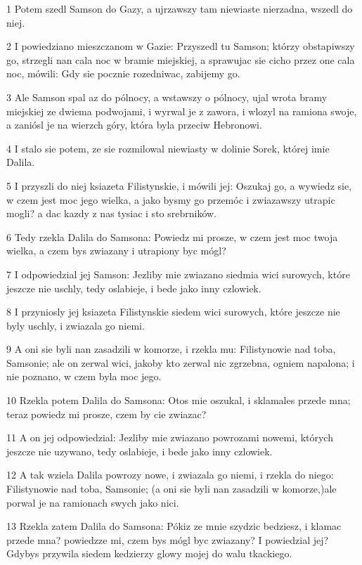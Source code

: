 \par 1 Potem szedl Samson do Gazy, a ujrzawszy tam niewiaste nierzadna, wszedl do niej.
\par 2 I powiedziano mieszczanom w Gazie: Przyszedl tu Samson; którzy obstapiwszy go, strzegli nan cala noc w bramie miejskiej, a sprawujac sie cicho przez one cala noc, mówili: Gdy sie pocznie rozedniwac, zabijemy go.
\par 3 Ale Samson spal az do pólnocy, a wstawszy o pólnocy, ujal wrota bramy miejskiej ze dwiema podwojami, i wyrwal je z zawora, i wlozyl na ramiona swoje, a zaniósl je na wierzch góry, która byla przeciw Hebronowi.
\par 4 I stalo sie potem, ze sie rozmilowal niewiasty w dolinie Sorek, której imie Dalila.
\par 5 I przyszli do niej ksiazeta Filistynskie, i mówili jej: Oszukaj go, a wywiedz sie, w czem jest moc jego wielka, a jako bysmy go przemóc i zwiazawszy utrapic mogli? a dac kazdy z nas tysiac i sto srebrników.
\par 6 Tedy rzekla Dalila do Samsona: Powiedz mi prosze, w czem jest moc twoja wielka, a czem bys zwiazany i utrapiony byc mógl?
\par 7 I odpowiedzial jej Samson: Jezliby mie zwiazano siedmia wici surowych, które jeszcze nie uschly, tedy oslabieje, i bede jako inny czlowiek.
\par 8 I przyniosly jej ksiazeta Filistynskie siedem wici surowych, które jeszcze nie byly uschly, i zwiazala go niemi.
\par 9 A oni sie byli nan zasadzili w komorze, i rzekla mu: Filistynowie nad toba, Samsonie; ale on zerwal wici, jakoby kto zerwal nic zgrzebna, ogniem napalona; i nie poznano, w czem byla moc jego.
\par 10 Rzekla potem Dalila do Samsona: Otos mie oszukal, i sklamales przede mna; teraz powiedz mi prosze, czem by cie zwiazac?
\par 11 A on jej odpowiedzial: Jezliby mie zwiazano powrozami nowemi, których jeszcze nie uzywano, tedy oslabieje, i bede jako inny czlowiek.
\par 12 A tak wziela Dalila powrozy nowe, i zwiazala go niemi, i rzekla do niego: Filistynowie nad toba, Samsonie; (a oni sie byli nan zasadzili w komorze,)ale porwal je na ramionach swych jako nici.
\par 13 Rzekla zatem Dalila do Samsona: Pókiz ze mnie szydzic bedziesz, i klamac przede mna? powiedzze mi, czem bys mógl byc zwiazany? I powiedzial jej? Gdybys przywila siedem kedzierzy glowy mojej do walu tkackiego.
